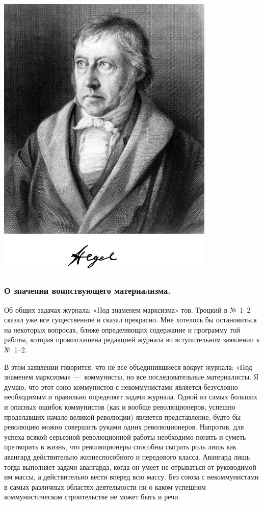\documentclass[twoside]{article}
\begin{document}
\bigskip

\clearpage\setcounter{page}{1}
\includegraphics[width=4.0937in,height=5.4457in]{hegel-img001.png} 


\bigskip

\clearpage\setcounter{page}{4}\subsubsection{О значении воинствующего
материализма.}
\label{bkm:Ref474526580}\hypertarget{Toc478978576}{}Об общих задачах
журнала: «Под знаменем марксизма» тов. Троцкий в №~1–2
сказал уже все существенное и сказал прекрасно. Мне хотелось бы
остановиться на некоторых вопросах, ближе определяющих содержание и
программу той работы, которая провозглашена редакцией журнала во
вступительном заявлении к №~1–2.

В этом заявлении говорится, что не все объединившиеся вокруг журнала: «Под
знаменем марксизма» —~коммунисты, но все последовательные материалисты. Я
думаю, что этот союз коммунистов с некоммунистами является безусловно
необходимым и правильно определяет задачи журнала. Одной из самых больших и
опасных ошибок коммунистов (как и вообще революционеров, успешно
проделавших начало великой революции) является представление, будто бы
революцию можно совершить руками одних революционеров. Напротив, для успеха
всякой серьезной революционной работы необходимо понять и суметь претворить
в жизнь, что революционеры способны сыграть роль лишь как авангард
действительно жизнеспособного и передового класса. Авангард лишь тогда
выполняет задачи авангарда, когда он умеет не отрываться от руководимой им
массы, а действительно вести вперед всю массу. Без союза с некоммунистами в
самых различных областях деятельности ни о каком успешном коммунистическом
строительстве не может быть и речи.
\end{document}
